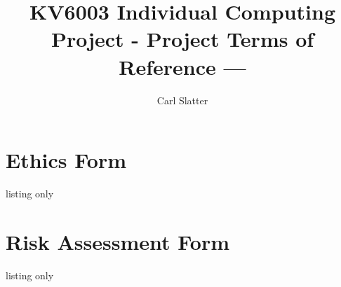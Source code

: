 \documentclass[12pt]{article}
\title{KV6003 Individual Computing Project - Project Terms of Reference --- }
\author{Carl Slatter}
\begin{document}
\maketitle




\appendix

\section{Ethics Form}
\begin{tcblisting}{listing only}

\end{tcblisting}


\section{Risk Assessment Form}
\begin{tcblisting}{listing only}

\end{tcblisting}
\end{document}
